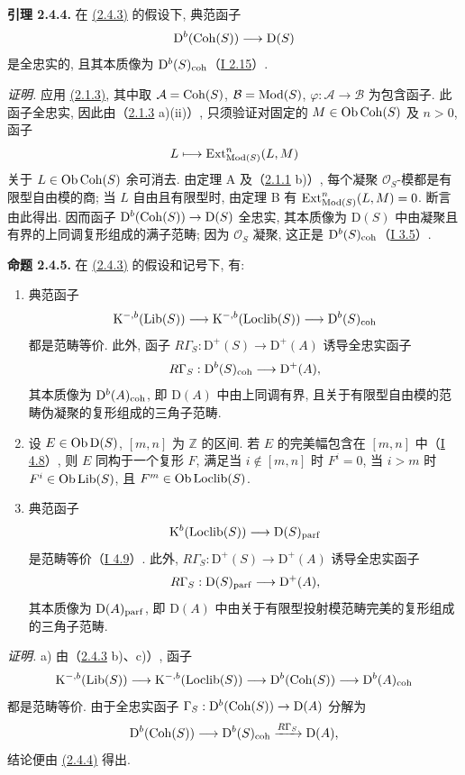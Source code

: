 \textbf{引理 2.4.4.} 在 \hyperlink{sga6.e02.lem.2-4-3}{(2.4.3)} 的假设下, 典范函子
\[
\mathrm D^b(\operatorname{Coh}(S))\longrightarrow\mathrm D(S)
\]
是全忠实的, 且其本质像为 $\mathrm D^b(S)_{\mathrm{coh}}$（\hyperlink{sga6.e01.ex.2-15}{I 2.15}）.

\emph{证明.} 应用 \hyperlink{sga6.e02.lem.2-1-3}{(2.1.3)}, 其中取 $\mathcal A=\operatorname{Coh}(S)$, $\mathcal B=\operatorname{Mod}(S)$, $\varphi:\mathcal A\to\mathcal B$ 为包含函子. 此函子全忠实, 因此由（\hyperlink{sga6.e02.lem.2-1-3}{2.1.3} a)(ii)）, 只须验证对固定的 $M\in\operatorname{Ob}\operatorname{Coh}(S)$ 及 $n>0$, 函子
\[
L\longmapsto \operatorname{Ext}^n_{\operatorname{Mod}(S)}(L,M)
\]
关于 $L\in\operatorname{Ob}\operatorname{Coh}(S)$ 余可消去. 由定理 A 及（\hyperlink{sga6.e02.lem.2-1-1}{2.1.1} b)）, 每个凝聚 $\mathcal O_S$-模都是有限型自由模的商; 当 $L$ 自由且有限型时, 由定理 B 有 $\operatorname{Ext}^n_{\operatorname{Mod}(S)}(L,M)=0$. 断言由此得出. 因而函子 $\mathrm D^b(\operatorname{Coh}(S))\to\mathrm D(S)$ 全忠实, 其本质像为 $\mathrm D(S)$ 中由凝聚且有界的上同调复形组成的满子范畴; 因为 $\mathcal O_S$ 凝聚, 这正是 $\mathrm D^b(S)_{\mathrm{coh}}$（\hyperlink{sga6.e01.cor.3-5}{I 3.5}）.

\textbf{命题 2.4.5.} 在 \hyperlink{sga6.e02.lem.2-4-3}{(2.4.3)} 的假设和记号下, 有:
\begin{enumerate}[label=\alph*)]
\item 典范函子
\[
\mathrm K^{-,b}(\operatorname{Lib}(S))\longrightarrow\mathrm K^{-,b}(\operatorname{Loclib}(S))\longrightarrow \mathrm D^b(S)_{\mathrm{coh}}
\]
都是范畴等价. 此外, 函子 $R\Gamma_S:\mathrm D^{+}(S)\to\mathrm D^{+}(A)$ 诱导全忠实函子
\[
R\Gamma_S:\mathrm D^b(S)_{\mathrm{coh}}\longrightarrow \mathrm D^{+}(A),
\]
其本质像为 $\mathrm D^b(A)_{\mathrm{coh}}$, 即 $\mathrm D(A)$ 中由上同调有界, 且关于有限型自由模的范畴伪凝聚的复形组成的三角子范畴.
\item 设 $E\in\operatorname{Ob}\mathrm D(S)$, $[m,n]$ 为 $\mathbb Z$ 的区间. 若 $E$ 的完美幅包含在 $[m,n]$ 中（\hyperlink{sga6.e01.ex.4-8}{I 4.8}）, 则 $E$ 同构于一个复形 $F$, 满足当 $i\notin[m,n]$ 时 $F^i=0$, 当 $i>m$ 时 $F^i\in\operatorname{Ob}\operatorname{Lib}(S)$, 且 $F^m\in\operatorname{Ob}\operatorname{Loclib}(S)$.
\item 典范函子
\[
\mathrm K^b(\operatorname{Loclib}(S))\longrightarrow \mathrm D(S)_{\mathrm{parf}}
\]
是范畴等价（\hyperlink{sga6.e01.notation.4-9}{I 4.9}）. 此外, $R\Gamma_S:\mathrm D^{+}(S)\to\mathrm D^{+}(A)$ 诱导全忠实函子
\[
R\Gamma_S:\mathrm D(S)_{\mathrm{parf}}\longrightarrow\mathrm D^+(A),
\]
其本质像为 $\mathrm D(A)_{\mathrm{parf}}$, 即 $\mathrm D(A)$ 中由关于有限型投射模范畴完美的复形组成的三角子范畴.
\end{enumerate}

\emph{证明.} a) 由（\hyperlink{sga6.e02.lem.2-4-3}{2.4.3} b)、c)）, 函子
\[
\mathrm K^{-,b}(\operatorname{Lib}(S))\longrightarrow\mathrm K^{-,b}(\operatorname{Loclib}(S))\longrightarrow
\mathrm D^b(\operatorname{Coh}(S))\longrightarrow\mathrm D^b(A)_{\mathrm{coh}}
\]
都是范畴等价. 由于全忠实函子 $\Gamma_S:\mathrm D^b(\operatorname{Coh}(S))\to\mathrm D(A)$ 分解为
\[
\mathrm D^b(\operatorname{Coh}(S))\longrightarrow\mathrm D^b(S)_{\mathrm{coh}}\xrightarrow{R\Gamma_S}\mathrm D(A),
\]
结论便由 \hyperlink{sga6.e02.lem.2-4-4}{(2.4.4)} 得出.

